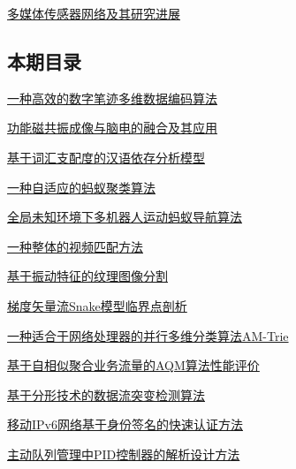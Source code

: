 \documentclass[a4paper]{article}
\begin{document}
\href{http://www.jos.org.cn/ch/reader/download_pdf.aspx?file_no=20060920&year_id=2006&quarter_id=9&falg=1}{多媒体传感器网络及其研究进展}

\subsection{本期目录}
\href{http://www.jos.org.cn/ch/reader/download_pdf.aspx?file_no=20060903&year_id=2006&quarter_id=9&falg=1}{一种高效的数字笔迹多维数据编码算法}

\href{http://www.jos.org.cn/ch/reader/download_pdf.aspx?file_no=20060904&year_id=2006&quarter_id=9&falg=1}{功能磁共振成像与脑电的融合及其应用}

\href{http://www.jos.org.cn/ch/reader/download_pdf.aspx?file_no=20060905&year_id=2006&quarter_id=9&falg=1}{基于词汇支配度的汉语依存分析模型}

\href{http://www.jos.org.cn/ch/reader/download_pdf.aspx?file_no=20060906&year_id=2006&quarter_id=9&falg=1}{一种自适应的蚂蚁聚类算法}

\href{http://www.jos.org.cn/ch/reader/download_pdf.aspx?file_no=20060907&year_id=2006&quarter_id=9&falg=1}{全局未知环境下多机器人运动蚂蚁导航算法}

\href{http://www.jos.org.cn/ch/reader/download_pdf.aspx?file_no=20060908&year_id=2006&quarter_id=9&falg=1}{一种整体的视频匹配方法}

\href{http://www.jos.org.cn/ch/reader/download_pdf.aspx?file_no=20060909&year_id=2006&quarter_id=9&falg=1}{基于振动特征的纹理图像分割}

\href{http://www.jos.org.cn/ch/reader/download_pdf.aspx?file_no=20060910&year_id=2006&quarter_id=9&falg=1}{梯度矢量流Snake模型临界点剖析}

\href{http://www.jos.org.cn/ch/reader/download_pdf.aspx?file_no=20060913&year_id=2006&quarter_id=9&falg=1}{一种适合于网络处理器的并行多维分类算法AM-Trie}

\href{http://www.jos.org.cn/ch/reader/download_pdf.aspx?file_no=20060914&year_id=2006&quarter_id=9&falg=1}{基于自相似聚合业务流量的AQM算法性能评价}

\href{http://www.jos.org.cn/ch/reader/download_pdf.aspx?file_no=20060915&year_id=2006&quarter_id=9&falg=1}{基于分形技术的数据流突变检测算法}

\href{http://www.jos.org.cn/ch/reader/download_pdf.aspx?file_no=20060916&year_id=2006&quarter_id=9&falg=1}{移动IPv6网络基于身份签名的快速认证方法}

\href{http://www.jos.org.cn/ch/reader/download_pdf.aspx?file_no=20060917&year_id=2006&quarter_id=9&falg=1}{主动队列管理中PID控制器的解析设计方法}
\end{document}
